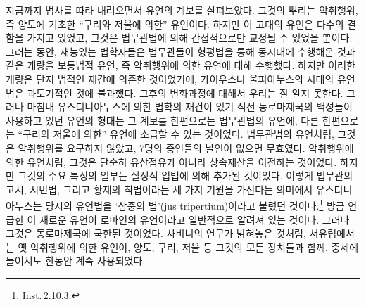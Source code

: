 지금까지 법사를 따라 내려오면서 유언의 계보를 살펴보았다.
그것의 뿌리는 악취행위, 즉 양도에 기초한 ``구리와 저울에 의한'' 유언이다.
하지만 이 고대의 유언은 다수의 결함을 가지고 있었고,
그것은 법무관법에 의해 간접적으로만 교정될 수 있었을 뿐이다.
그러는 동안, 재능있는 법학자들은
법무관들이 형평법을 통해 동시대에 수행해온 것과 같은 개량을
보통법적 유언, 즉 악취행위에 의한 유언에 대해 수행했다.
하지만 이러한 개량은 단지 법적인 재간에 의존한 것이었기에,
가이우스나 울피아누스의 시대의 유언법은 과도기적인 것에 불과했다.
그후의 변화과정에 대해서 우리는 잘 알지 못한다.
그러나 마침내 유스티니아누스에 의한 법학의 재건이 있기 직전
동로마제국의 백성들이 사용하고 있던 유언의 형태는
그 계보를 한편으로는 법무관법의 유언에,
다른 한편으로는 ``구리와 저울에 의한'' 유언에 소급할 수 있는
것이었다.
법무관법의 유언처럼, 그것은 악취행위를 요구하지 않았고,
7명의 증인들의 날인이 없으면 무효였다.
악취행위에 의한 유언처럼, 그것은 단순히 유산점유가 아니라
상속재산을 이전하는 것이었다.
하지만 그것의 주요 특징의 일부는 실정적 입법에 의해 추가된 것이었다.
이렇게 법무관의 고시, 시민법, 그리고 황제의 칙법이라는
세 가지 기원을 가진다는 의미에서
유스티니아누스는 당시의 유언법을
`삼중의 법'(jus tripertium)이라고 불렀던 것이다.\footnote{Inst.\,2.10.3.}
방금 언급한 이 새로운 유언이
로마인의 유언이라고
일반적으로
알려져 있는 것이다.
그러나 그것은 동로마제국에 국한된 것이었다.
사비니의 연구가 밝혀놓은 것처럼,
서유럽에서는 옛 악취행위에 의한 유언이,
양도, 구리, 저울 등 그것의 모든 장치들과 함께,
중세에 들어서도 한동안 계속 사용되었다.

